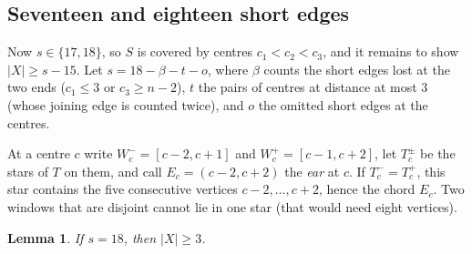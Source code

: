 \documentclass[11pt]{amsart}
\newtheorem{lemma}[theorem]{Lemma}
\theoremstyle{definition}\newtheorem{problem}{Problem}
\theoremstyle{remark}\newtheorem*{remark}{Remark}
\begin{document}
\subsection{Seventeen and eighteen short edges}
Now $s\in\{17,18\}$, so $S$ is covered by centres $c_1<c_2<c_3$, and it remains to show $|X|\ge s-15$. Let
$s=18-\beta-t-o$, where $\beta$ counts the short edges lost at the two ends ($c_1\le3$ or $c_3\ge n-2$), $t$ the pairs of
centres at distance at most $3$ (whose joining edge is counted twice), and $o$ the omitted short edges at the centres.

At a centre $c$ write $W_c^-=[c-2,c+1]$ and $W_c^+=[c-1,c+2]$, let $T_c^\pm$ be the stars of $T$ on them, and call
$E_c=(c-2,c+2)$ the \emph{ear} at $c$. If $T_c^-=T_c^+$, this star contains the five consecutive vertices
$c-2,\dots,c+2$, hence the chord $E_c$. Two windows that are disjoint cannot lie in one star (that would need eight
vertices).

\begin{lemma}\label{lem:eighteen}
If $s=18$, then $|X|\ge3$.
\end{lemma}
\end{document}
